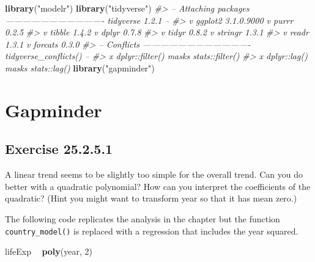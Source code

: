 \documentclass[]{book}
\newenvironment{Shaded}{\begin{snugshade}}{\end{snugshade}}
\newcommand{\CommentTok}[1]{\textcolor[rgb]{0.56,0.35,0.01}{\textit{#1}}}
\newcommand{\DecValTok}[1]{\textcolor[rgb]{0.00,0.00,0.81}{#1}}
\newcommand{\KeywordTok}[1]{\textcolor[rgb]{0.13,0.29,0.53}{\textbf{#1}}}
\newcommand{\NormalTok}[1]{#1}
\newcommand{\OperatorTok}[1]{\textcolor[rgb]{0.81,0.36,0.00}{\textbf{#1}}}
\newcommand{\StringTok}[1]{\textcolor[rgb]{0.31,0.60,0.02}{#1}}
\theoremstyle{plain}
\theoremstyle{remark}
\begin{document}
\begin{Shaded}
\begin{Highlighting}[]
\KeywordTok{library}\NormalTok{(}\StringTok{"modelr"}\NormalTok{)}
\KeywordTok{library}\NormalTok{(}\StringTok{"tidyverse"}\NormalTok{)}
\CommentTok{#> -- Attaching packages ---------------------------------- tidyverse 1.2.1 --}
\CommentTok{#> v ggplot2 3.1.0.9000     v purrr   0.2.5     }
\CommentTok{#> v tibble  1.4.2          v dplyr   0.7.8     }
\CommentTok{#> v tidyr   0.8.2          v stringr 1.3.1     }
\CommentTok{#> v readr   1.3.1          v forcats 0.3.0}
\CommentTok{#> -- Conflicts ------------------------------------- tidyverse_conflicts() --}
\CommentTok{#> x dplyr::filter() masks stats::filter()}
\CommentTok{#> x dplyr::lag()    masks stats::lag()}
\KeywordTok{library}\NormalTok{(}\StringTok{"gapminder"}\NormalTok{)}
\end{Highlighting}
\end{Shaded}

\hypertarget{gapminder}{%
\section{Gapminder}\label{gapminder}}

\hypertarget{exercise-25.2.5.1}{%
\subsection*{\texorpdfstring{Exercise {25.2.5.1}}{Exercise 25.2.5.1}}\label{exercise-25.2.5.1}}

A linear trend seems to be slightly too simple for the overall trend. Can you do better with a quadratic polynomial? How can you interpret the coefficients of the quadratic? (Hint you might want to transform year so that it has mean zero.)

The following code replicates the analysis in the chapter but the function \texttt{country\_model()} is replaced with a regression that includes the year squared.

\begin{Shaded}
\begin{Highlighting}[]
\NormalTok{lifeExp }\OperatorTok{~}\StringTok{ }\KeywordTok{poly}\NormalTok{(year, }\DecValTok{2}\NormalTok{)}
\end{Highlighting}
\end{Shaded}
\end{document}
